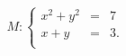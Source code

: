 \documentclass{article}
\begin{document}
\vspace*{\fill} \vspace*{-5ex}
$$
M:  \left\{
\begin{array}{ccl}
x^2+y^2&=&7\\
x+y & = &3.\\
\end{array}
\right.
$$

\vspace*{\fill}
\end{document}
